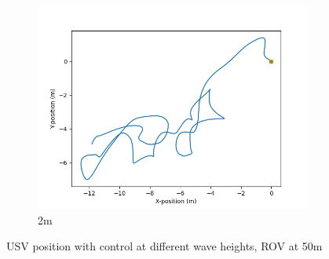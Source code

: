 \documentclass[class=article, crop=false]{standalone}
\begin{document}
\begin{figure}
\begin{subfigure}[b]{0.48\textwidth}
        \includegraphics{scenario1/rov-50m/2.0m/usv_position_controlled}
        \caption{2m}
        \label{}
    \end{subfigure}

    \caption{USV position with control at different wave heights, ROV at 50m}
\end{figure}
\end{document}
